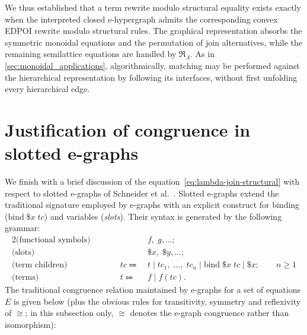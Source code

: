 We thus established that a term rewrite modulo structural equality
exists exactly when the interpreted closed e-hypergraph admits the
corresponding convex EDPOI rewrite modulo structural rules. The
graphical representation absorbs the symmetric monoidal equations and
the permutation of join alternatives, while the remaining semilattice
equations are handled by $\mathfrak R_{\Lambda}$. As in
\cref{sec:monoidal_applications}, algorithmically, matching may be performed against the
hierarchical representation by following its interfaces, without first
unfolding every hierarchical edge.

\section{Justification of congruence in slotted e-graphs}
We finish with a brief discussion of the equation~\eqref{eq:lambda-join-structural} with respect to slotted e-graphs of Schneider et al.~\cite{slotted-egraphs}.
Slotted e-graphs extend the traditional signature employed by e-graphs with an explicit construct for binding ($\text{bind}\; \$x\; tc$) and variables (\emph{slots}).
	Their syntax is generated by the following grammar:
	\begin{alignat*}{2}
		\text{(functional symbols)} &        &                            & \; f,\;g, \ldots ;                                                                       \\
		\text{(slots)}              &        &                            & \; \$x,\; \$y, \ldots ;                                                                   \\
		\text{(term children)}      &        & tc               \Coloneqq & \; t \mid tc_{1},\; \ldots,\; tc_{n} \mid \text{bind}\; \$x\; tc \mid \$x ; \qquad n \geq 1 \\
		\text{(terms)}              & \qquad & t                \Coloneqq & \; f \mid f(tc) .
	\end{alignat*}
	The traditional congruence relation maintained by e-graphs for a set of equations $E$ is given below (plus the obvious rules for transitivity, symmetry and reflexivity of $\cong$; in this subsection only, $\cong$ denotes the e-graph congruence rather than isomorphism):
